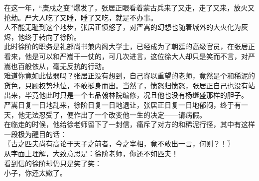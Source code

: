 \begin{multicols}{\theparacolNo}
在这一年，“庚戍之变”爆发了，张居正眼看着蒙古兵来了又走，走了又来，放火又抢劫。严大人吃了又睡，睡了又吃，就是不办事。\\

人不能无耻到这个地步，张居正愤怒了，对严嵩的幻想也随着城外的大火化为灰烬，他终于转向了徐阶。\\

此时徐阶的职务是礼部尚书兼内阁大学士，已经成为了朝廷的高级官员，在张居正看来，他是可以和严嵩干一仗的，可几次进言，这位徐大人却只是笑而不言，对严嵩也百般依从，毫无反抗的行动。\\

难道你竟如此怯弱吗？张居正没有想到，自己寄以重望的老师，竟然是个和稀泥的货色，只顾权势地位，不敢挺身而出。当然了，愤怒归愤怒，张居正自己也没有站出来，毕竟他此时只是一个七品翰林院编修，况且他也没有杨继盛那样的胆子。\\

严嵩日复一日地乱来，徐阶日复一日地退让，张居正日复一日地郁闷，终于有一天，他无法忍受了，便作出了一个改变他一生的决定——请病假。\\

在临走的时候，他给徐老师留下了一封信，痛斥了对方的和稀泥行径，其中有这样一段极为醒目的话：\\

〖古之匹夫尚有高论于天子之前者，今之宰相，竟不敢出一言，何则？！〗\\

从字面上理解，大致意思是：徐阶老师，你还不如匹夫！\\

看到信的徐阶却仍只是笑了笑：\\

小子，你还太嫩了。\\
\ifnum{}
	\end{multicols}
\fi
\newpage
